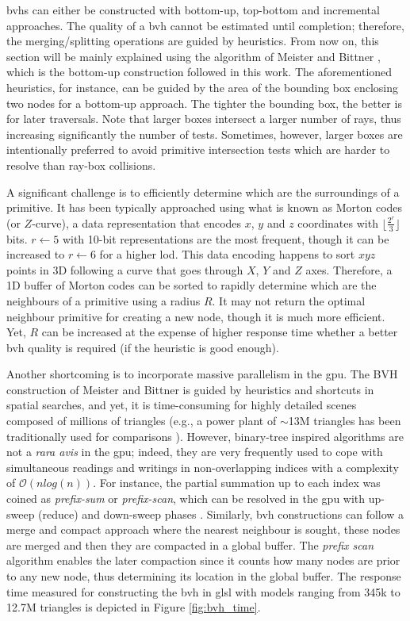 \acrshort{bvh}s can either be constructed with bottom-up, top-bottom and incremental approaches. The quality of a \acrshort{bvh} cannot be estimated until completion; therefore, the merging/splitting operations are guided by heuristics. From now on, this section will be mainly explained using the algorithm of Meister and Bittner \cite{meister_parallel_2018}, which is the bottom-up construction followed in this work. The aforementioned heuristics, for instance, can be guided by the area of the bounding box enclosing two nodes for a bottom-up approach. The tighter the bounding box, the better is for later traversals. Note that larger boxes intersect a larger number of rays, thus increasing significantly the number of tests. Sometimes, however, larger boxes are intentionally preferred to avoid primitive intersection tests which are harder to resolve than ray-box collisions.

A significant challenge is to efficiently determine which are the surroundings of a primitive. It has been typically approached using what is known as Morton codes (or $Z$-curve), a data representation that encodes $x$, $y$ and $z$ coordinates with $\lfloor{\frac{2^r}{3}\rfloor}$ bits. $r \gets 5$ with 10-bit representations are the most frequent, though it can be increased to $r \gets 6$ for a higher \acrshort{lod}. This data encoding happens to sort $xyz$ points in 3D following a curve that goes through $X$, $Y$ and $Z$ axes. Therefore, a 1D buffer of Morton codes can be sorted to rapidly determine which are the neighbours of a primitive using a radius $R$. It may not return the optimal neighbour primitive for creating a new node, though it is much more efficient. Yet, $R$ can be increased at the expense of higher response time whether a better \acrshort{bvh} quality is required (if the heuristic is good enough). 

Another shortcoming is to incorporate massive parallelism in the \acrshort{gpu}. The BVH construction of Meister and Bittner \cite{meister_parallel_2018} is guided by heuristics and shortcuts in spatial searches, and yet, it is time-consuming for highly detailed scenes composed of millions of triangles (e.g., a power plant of $\sim$13M triangles has been traditionally used for comparisons \cite{mcguire_computer_2017}). However, binary-tree inspired algorithms are not a \textit{rara avis} in the \acrshort{gpu}; indeed, they are very frequently used to cope with simultaneous readings and writings in non-overlapping indices with a complexity of $\mathcal{O}(n\textit{log}(n))$. For instance, the partial summation up to each index was coined as \textit{prefix-sum} or \textit{prefix-scan}, which can be resolved in the \acrshort{gpu} with up-sweep (reduce) and down-sweep phases \cite{nguyen_gpu_2007}. Similarly, \acrshort{bvh} constructions can follow a merge and compact approach where the nearest neighbour is sought, these nodes are merged and then they are compacted in a global buffer. The \textit{prefix scan} algorithm enables the later compaction since it counts how many nodes are prior to any new node, thus determining its location in the global buffer. The response time measured for constructing the \acrshort{bvh} in \acrshort{glsl} with models ranging from 345k to 12.7M triangles is depicted in Figure \ref{fig:bvh_time}. 

